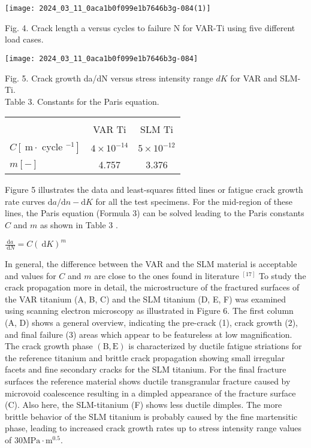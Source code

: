 \documentclass[10pt]{article}
\begin{document}
\begin{center}
\texttt{[image: 2024\_03\_11\_0aca1b0f099e1b7646b3g-084(1)]}
\end{center}

Fig. 4. Crack length a versus cycles to failure N for VAR-Ti using five different load cases.

\begin{center}
\texttt{[image: 2024\_03\_11\_0aca1b0f099e1b7646b3g-084]}
\end{center}

Fig. 5. Crack growth da/dN versus stress intensity range $d K$ for VAR and SLM-Ti.\\
Table 3. Constants for the Paris equation.

\begin{center}
\begin{tabular}{lcc}
 &  &  \\
 & VAR Ti & SLM Ti \\
\hline
$C\left[\mathrm{~m} \cdot\right.$ cycle $\left.^{-1}\right]$ & $4 \times 10^{-14}$ & $5 \times 10^{-12}$ \\
$m[-]$ & 4.757 & 3.376 \\
\end{tabular}
\end{center}

Figure 5 illustrates the data and least-squares fitted lines or fatigue crack growth rate curves $\mathrm{d} a / \mathrm{d} n-\mathrm{d} K$ for all the test specimens. For the mid-region of these lines, the Paris equation (Formula 3) can be solved leading to the Paris constants $C$ and $m$ as shown in Table 3 .

$\frac{\mathrm{d} a}{\mathrm{~d} N}=C(\mathrm{~d} K)^{m}$

In general, the difference between the VAR and the SLM material is acceptable and values for $C$ and $m$ are close to the ones found in literature ${ }^{[17]}$ To study the crack propagation more in detail, the microstructure of the fractured surfaces of the VAR titanium (A, B, C) and the SLM titanium (D, E, F) was examined using scanning electron microscopy as illustrated in Figure 6. The first column (A, D) shows a general overview, indicating the pre-crack (1), crack growth (2), and final failure (3) areas which appear to be featureless at low magnification. The crack growth phase $(\mathrm{B}, \mathrm{E})$ is characterized by ductile fatigue striations for the reference titanium and brittle crack propagation showing small irregular facets and fine secondary cracks for the SLM titanium. For the final fracture surfaces the reference material shows ductile transgranular fracture caused by microvoid coalescence resulting in a dimpled appearance of the fracture surface (C). Also here, the SLM-titanium (F) shows less ductile dimples. The more brittle behavior of the SLM titanium is probably caused by the fine martensitic phase, leading to increased crack growth rates up to stress intensity range values of $30 \mathrm{MPa} \cdot \mathrm{m}^{0.5}$.
\end{document}
